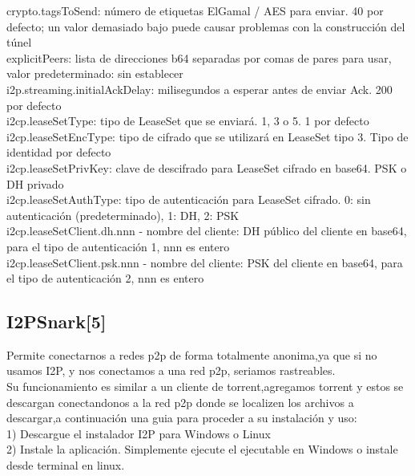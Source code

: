 \documentclass{article}
\begin{document}
crypto.tagsToSend: número de etiquetas ElGamal / AES para enviar. 40 por defecto; un valor demasiado bajo puede causar problemas con la construcción del túnel
\\

explicitPeers: lista de direcciones b64 separadas por comas de pares para usar, valor predeterminado: sin establecer
\\

i2p.streaming.initialAckDelay: milisegundos a esperar antes de enviar Ack. 200 por defecto
\\

i2cp.leaseSetType: tipo de LeaseSet que se enviará. 1, 3 o 5. 1 por defecto
\\

i2cp.leaseSetEncType: tipo de cifrado que se utilizará en LeaseSet tipo 3. Tipo de identidad por defecto
\\

i2cp.leaseSetPrivKey: clave de descifrado para LeaseSet cifrado en base64. PSK o DH privado
\\

i2cp.leaseSetAuthType: tipo de autenticación para LeaseSet cifrado. 0: sin autenticación (predeterminado), 1: DH, 2: PSK
\\

i2cp.leaseSetClient.dh.nnn - nombre del cliente: DH público del cliente en base64, para el tipo de autenticación 1, nnn es entero
\\

i2cp.leaseSetClient.psk.nnn - nombre del cliente: PSK del cliente en base64, para el tipo de autenticación 2, nnn es entero 
\subsection{I2PSnark[5]}
Permite conectarnos a redes p2p de forma totalmente anonima,ya que si no usamos I2P, y nos conectamos a una red p2p, seriamos rastreables.
\\

Su funcionamiento es similar a un cliente de torrent,agregamos torrent y estos se descargan conectandonos a la red p2p donde se localizen los archivos a descargar,a continuación 
una guia para proceder a su instalación y uso:
\\

1) Descargue el instalador I2P para Windows o Linux
\\

2) Instale la aplicación. Simplemente ejecute el ejecutable en Windows o instale desde terminal en linux.
\\
\end{document}
